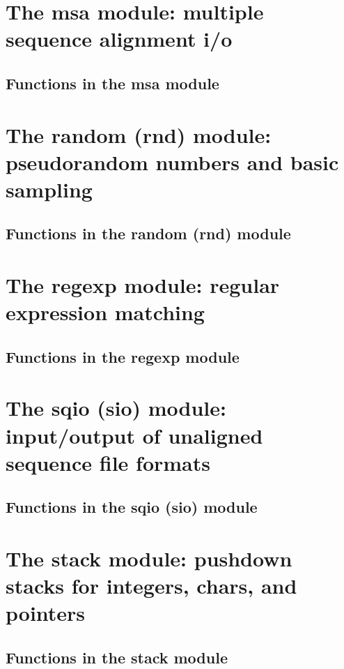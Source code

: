 \documentclass[11pt]{article}
\begin{document}
\newpage
\section{The msa module: multiple sequence alignment i/o}

\subsection{Functions in the msa module}


\newpage
\section{The random (rnd) module: pseudorandom numbers and basic sampling}

\subsection{Functions in the random (rnd) module}


\newpage
\section{The regexp module: regular expression matching}

\subsection{Functions in the regexp module}


\newpage
\section{The sqio (sio) module: input/output of unaligned sequence file formats}

\subsection{Functions in the sqio (sio) module}


\newpage
\section{The stack module: pushdown stacks for integers, chars, and pointers}

\subsection{Functions in the stack module}

\end{document}
